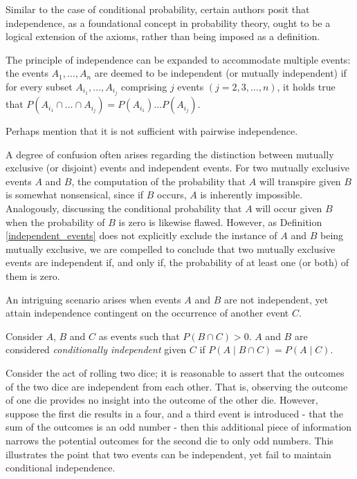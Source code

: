 Similar to the case of conditional probability, certain authors posit that independence, as a foundational concept in probability theory, ought to be a logical extension of the axioms, rather than being imposed as a definition.

The principle of independence can be expanded to accommodate multiple events: the events $A_{1}, \ldots, A_{n}$ are deemed to be independent (or mutually independent) if for every subset $A_{i_1}, \ldots, A_{i_j}$ comprising $j$ events $\left( j = 2, 3, \ldots, n \right)$, it holds true that $P \left( A_{i_1} \cap \ldots \cap A_{i_j} \right) = P \left( A_{i_1} \right) \ldots P \left( A_{i_j}\right)$.

{\color{red} Perhaps mention that it is not sufficient with pairwise independence.}

\begin{example}
A degree of confusion often arises regarding the distinction between mutually exclusive (or disjoint) events and independent events. For two mutually exclusive events $A$ and $B$, the computation of the probability that $A$ will transpire given $B$ is somewhat nonsensical, since if $B$ occurs, $A$ is inherently impossible. Analogously, discussing the conditional probability that $A$ will occur given $B$ when the probability of $B$ is zero is likewise flawed. However, as Definition \ref{independent_events} does not explicitly exclude the instance of $A$ and $B$ being mutually exclusive, we are compelled to conclude that two mutually exclusive events are independent if, and only if, the probability of at least one (or both) of them is zero.
\end{example}

An intriguing scenario arises when events $A$ and $B$ are not independent, yet attain independence contingent on the occurrence of another event $C$.

\begin{definition}
Consider $A$, $B$ and $C$ as events such that $P\left( B \cap C \right)>0$. $A$ and $B$ are considered \emph{conditionally independent} given $C$ if $P\left(A \mid B \cap C \right) = P\left( A \mid C \right)$.
\end{definition}

\begin{example}
Consider the act of rolling two dice; it is reasonable to assert that the outcomes of the two dice are independent from each other. That is, observing the outcome of one die provides no insight into the outcome of the other die. However, suppose the first die results in a four, and a third event is introduced - that the sum of the outcomes is an odd number - then this additional piece of information narrows the potential outcomes for the second die to only odd numbers. This illustrates the point that two events can be independent, yet fail to maintain conditional independence.
\end{example}

